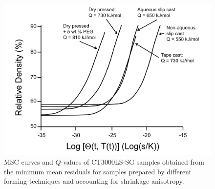 \newpage
\begin{figure}[H]
	\centering
	\includegraphics[width=\textwidth]{Chapter-6/Figures/Figure6.png}
	\caption{MSC curves and $Q$-values of CT3000LS-SG samples obtained from the minimum mean residuals for samples prepared by different forming techniques and accounting for shrinkage anisotropy.}
	\label{Ch6-figure:Figure6}
\end{figure}

